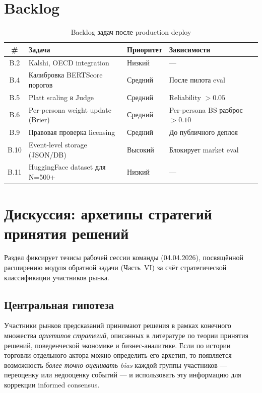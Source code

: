\documentclass[a4paper, 11pt]{article}
\begin{document}
\section{Backlog}

\begin{table}[h]
\centering
\begin{tabular}{clll}
\toprule
\textbf{\#} & \textbf{Задача} & \textbf{Приоритет} & \textbf{Зависимости} \\
\midrule
B.2  & Kalshi, OECD integration         & Низкий   & --- \\
B.4  & Калибровка BERTScore порогов      & Средний  & После пилота eval \\
B.5  & Platt scaling в Judge             & Средний  & Reliability $> 0.05$ \\
B.6  & Per-persona weight update (Brier) & Средний  & Per-persona BS разброс $> 0.10$ \\
B.9  & Правовая проверка licensing       & Средний  & До публичного деплоя \\
B.10 & Event-level storage (JSON/DB)     & Высокий  & Блокирует market eval \\
B.11 & HuggingFace dataset для N=500+    & Низкий   & --- \\
\bottomrule
\end{tabular}
\caption{Backlog задач после production deploy\protect\footnotemark}
\label{tab:backlog}
\end{table}

\section{Дискуссия: архетипы стратегий принятия решений}
\label{sec:discussion_archetypes}

Раздел фиксирует тезисы рабочей сессии команды (04.04.2026),
посвящённой расширению модуля обратной задачи (Часть~VI)
за счёт стратегической классификации участников рынка.

\subsection{Центральная гипотеза}

Участники рынков предсказаний принимают решения
в рамках конечного множества \emph{архетипов стратегий},
описанных в литературе по теории принятия решений,
поведенческой экономике и бизнес-аналитике.
Если по истории торговли отдельного актора можно определить его архетип,
то появляется возможность \emph{более точно оценивать bias}
каждой группы участников --- переоценку или недооценку событий ---
и использовать эту информацию для коррекции informed consensus.
\end{document}
